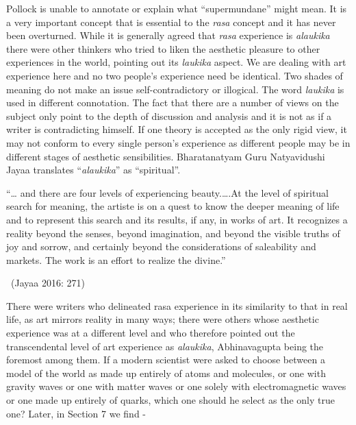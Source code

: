 Pollock is unable to annotate or explain what “supermundane” might mean. It is a very important concept that is essential to the \textit{rasa} concept and it has never been overturned. While it is generally agreed that \textit{rasa} experience is \textit{alaukika} there were other thinkers who tried to liken the aesthetic pleasure to other experiences in the world, pointing out its \textit{laukika} aspect. We are dealing with art experience here and no two people’s experience need be identical. Two shades of meaning do not make an issue self-contradictory or illogical. The word \textit{laukika} is used in different connotation. The fact that there are a number of views on the subject only point to the depth of discussion and analysis and it is not as if a writer is contradicting himself. If one theory is accepted as the only rigid view, it may not conform to every single person’s experience as different people may be in different stages of aesthetic sensibilities. Bharatanatyam Guru Natyavidushi Jayaa translates “\textit{alaukika}” as “spiritual”.

\begin{myquote}
“… and there are four levels of experiencing beauty.….At the level of spiritual search for meaning, the artiste is on a quest to know the deeper meaning of life and to represent this search and its results, if any, in works of art. It recognizes a reality beyond the senses, beyond imagination, and beyond the visible truths of joy and sorrow, and certainly beyond the considerations of saleability and markets. The work is an effort to realize the divine.” 

~\hfill (Jayaa 2016: 271)
\end{myquote}

There were writers who delineated rasa experience in its similarity to that in real life, as art mirrors reality in many ways; there were others whose aesthetic experience was at a different level and who therefore pointed out the transcendental level of art experience as \textit{alaukika}, Abhinavagupta being the foremost among them. If a modern scientist were asked to choose between a model of the world as made up entirely of atoms and molecules, or one with gravity waves or one with matter waves or one solely with electromagnetic waves or one made up entirely of quarks, which one should he select as the only true one? Later, in Section 7 we find -

